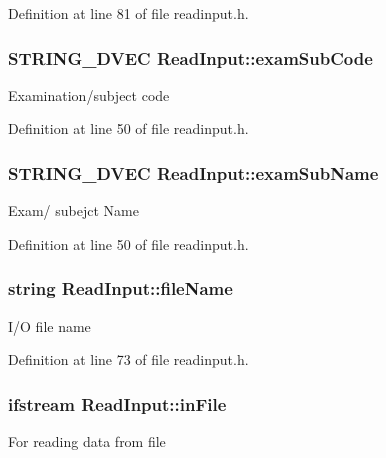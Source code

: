 \-Definition at line 81 of file readinput.\-h.

\hypertarget{classReadInput_a81eee5f7478e5d2d76afad814a6c4e3e}{
\subsubsection[{exam\-Sub\-Code}]{\setlength{\rightskip}{0pt plus 5cm}\-S\-T\-R\-I\-N\-G\-\_\-D\-V\-E\-C {\bf \-Read\-Input\-::exam\-Sub\-Code}}}\label{de/d50/classReadInput_a81eee5f7478e5d2d76afad814a6c4e3e}
\-Examination/subject code 

\-Definition at line 50 of file readinput.\-h.

\hypertarget{classReadInput_a6ac62618d1b89d823230ae93c7b85c3b}{
\subsubsection[{exam\-Sub\-Name}]{\setlength{\rightskip}{0pt plus 5cm}\-S\-T\-R\-I\-N\-G\-\_\-D\-V\-E\-C {\bf \-Read\-Input\-::exam\-Sub\-Name}}}\label{de/d50/classReadInput_a6ac62618d1b89d823230ae93c7b85c3b}
\-Exam/ subejct \-Name 

\-Definition at line 50 of file readinput.\-h.

\hypertarget{classReadInput_a834acf783052b5b2f129644b4accaadc}{
\subsubsection[{file\-Name}]{\setlength{\rightskip}{0pt plus 5cm}string {\bf \-Read\-Input\-::file\-Name}}}\label{de/d50/classReadInput_a834acf783052b5b2f129644b4accaadc}
\-I/\-O file name 

\-Definition at line 73 of file readinput.\-h.

\hypertarget{classReadInput_afe0f493fcb2da1f644445501823fd0e2}{
\subsubsection[{in\-File}]{\setlength{\rightskip}{0pt plus 5cm}ifstream {\bf \-Read\-Input\-::in\-File}}}\label{de/d50/classReadInput_afe0f493fcb2da1f644445501823fd0e2}
\-For reading data from file 

